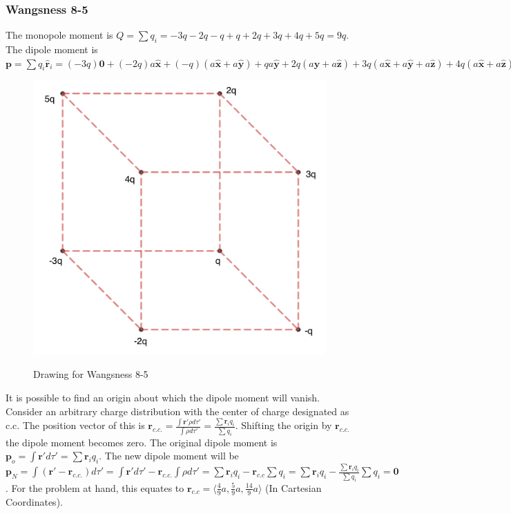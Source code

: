 \documentclass{article}
\theoremstyle{mystyle}
\begin{document}
\subsubsection{Wangsness 8-5}
The monopole moment is $Q = \sum q_i = -3q-2q-q+q+2q+3q+4q+5q=9q$.
The dipole moment is $\mathbf{p} = \sum q_i \hat{\mathbf{r}}_i = (-3q)\mathbf{0} + (-2q)a\hat{\mathbf{x}} + (-q)(a\hat{\mathbf{x}}+a\hat{\mathbf{y}})+qa\hat{\mathbf{y}} + 2q(a\hat{\mathbf{y}}+a\hat{\mathbf{z}})+3q(a\hat{\mathbf{x}}+a\hat{\mathbf{y}}+a\hat{\mathbf{z}})+4q(a\hat{\mathbf{x}}+a\hat{\mathbf{z}})+5qa\hat{\mathbf{z}}=4qa\hat{\mathbf{x}}+5qa\hat{\mathbf{y}}+14aq\hat{\mathbf{z}}$
\begin{figure}[htbp]
    \centering
    {\includegraphics[scale=0.4]{8-5.png}}
    \caption{Drawing for Wangsness 8-5}
\end{figure}
It is possible to find an origin about which the dipole moment will vanish. Consider an arbitrary charge distribution with the center of charge designated as c.c. The position vector of this is $\mathbf{r}_{c.c.} = \frac{\int \mathbf{r}' \rho d\tau '}{\int \rho d\tau '} = \frac{\sum \mathbf{r}_i q_i}{\sum q_i}$. Shifting the origin by $\mathbf{r}_{c.c.}$ the dipole moment becomes zero. The original dipole moment is $\mathbf{p}_{o} = \int \mathbf{r}' d\tau ' = \sum \mathbf{r}_i q_i$. The new dipole moment will be $\mathbf{p}_N = \int (\mathbf{r}' - \mathbf{r}_{c.c.})d\tau' = \int \mathbf{r}' d\tau' - \mathbf{r}_{c.c.} \int \rho d\tau' = \sum \mathbf{r}_i q_i - \mathbf{r}_{c.c} \sum q_i = \sum \mathbf{r}_i q_i - \frac{\sum \mathbf{r}_i q_i }{\sum q_i}\sum q_i = \mathbf{0}$. For the problem at hand, this equates to $\mathbf{r}_{c.c} = \langle \frac{4}{9}a, \frac{5}{9}a, \frac{14}{9}a\rangle$ (In Cartesian Coordinates).
\end{document}
